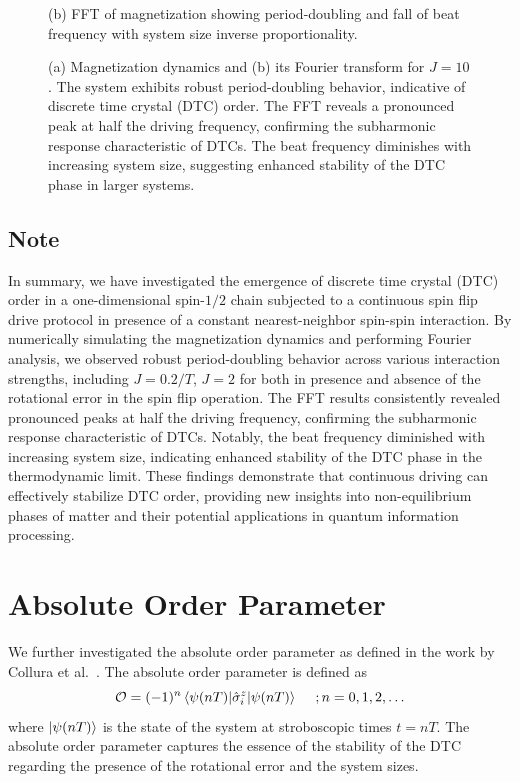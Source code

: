 \documentclass[a4paper, 11pt]{article}
\begin{document}
\begin{figure}[h!]
\begin{minipage}[t]{0.48\textwidth}
        \caption*{(b) FFT of magnetization showing period-doubling and fall of beat frequency with system size inverse proportionality.}
    \end{minipage}
    \caption{(a) Magnetization dynamics and (b) its Fourier transform for $J = 10$. The system exhibits robust period-doubling behavior, indicative of discrete time crystal (DTC) order. The FFT reveals a pronounced peak at half the driving frequency, confirming the subharmonic response characteristic of DTCs. The beat frequency diminishes with increasing system size, suggesting enhanced stability of the DTC phase in larger systems.}  
\end{figure}

\subsection{Note}

In summary, we have investigated the emergence of discrete time crystal (DTC) order in a one-dimensional spin-$1/2$ chain subjected to a continuous spin flip drive protocol in presence of a constant nearest-neighbor spin-spin interaction. By numerically simulating the magnetization dynamics and performing Fourier analysis, we observed robust period-doubling behavior across various interaction strengths, including $J = 0.2/T$, $J = 2$ for both in presence and absence of the rotational error in the spin flip operation. The FFT results consistently revealed pronounced peaks at half the driving frequency, confirming the subharmonic response characteristic of DTCs. Notably, the beat frequency diminished with increasing system size, indicating enhanced stability of the DTC phase in the thermodynamic limit. These findings demonstrate that continuous driving can effectively stabilize DTC order, providing new insights into non-equilibrium phases of matter and their potential applications in quantum information processing.

\newpage
\section{Absolute Order Parameter}
We further investigated the absolute order parameter as defined in the work by Collura et al.~\cite{Collura2023}. The absolute order parameter is defined as
\begin{equation}
    \mathcal{O} = (-1)^n \expval{\hat{\sigma}_i^z}{\psi(nT)} \quad\; ;n=0,1,2,\ldots
\end{equation}
where $\ket{\psi(nT)}$ is the state of the system at stroboscopic times $t = nT$. The absolute order parameter captures the essence of the stability of the DTC regarding the presence of the rotational error and the system sizes.
\end{document}

